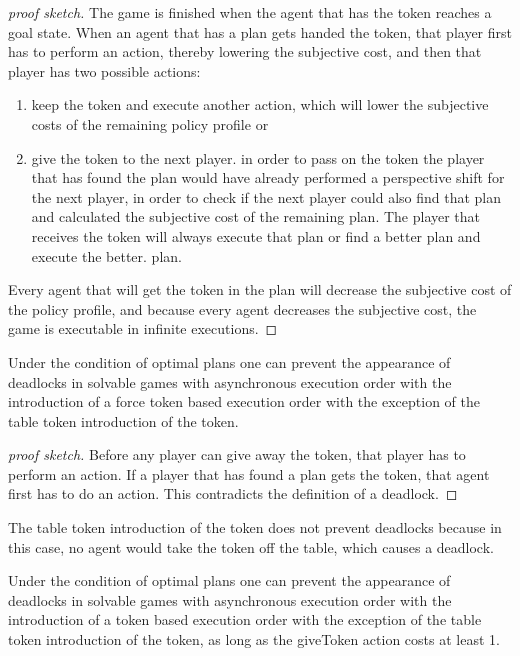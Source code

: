 \begin{proof}[proof sketch]
  The game is finished when the agent that has the token reaches a goal state. When an agent that has a plan gets handed the token, that player first has to perform an action, thereby lowering the subjective cost, and then that player has two possible actions:
  \begin{enumerate}
    \item keep the token and execute another action, which will lower the subjective costs of the remaining policy profile or
    \item give the token to the next player. in order to pass on the token the player that has found the plan would have already performed a perspective shift for the next player, in order to check if the next player could also find that plan and calculated the subjective cost of the remaining plan. The player that receives the token will always execute that plan or find a better plan and execute the better. plan.
  \end{enumerate}
  Every agent that will get the token in the plan will decrease the subjective cost of the policy profile, and because every agent decreases the subjective cost, the game is executable in infinite executions.
\end{proof}

\begin{theorem}
Under the condition of optimal plans one can prevent the appearance of deadlocks in solvable games with asynchronous execution order with the introduction of a force token based execution order with the exception of the table token introduction of the token.
\end{theorem}

\begin{proof}[proof sketch]
  Before any player can give away the token, that player has to perform an action. If a player that has found a plan gets the token, that agent first has to do an action. This contradicts the definition of a deadlock.
\end{proof}

The table token introduction of the token does not prevent deadlocks because in this case, no agent would take the token off the table, which causes a deadlock.

\begin{theorem}
  Under the condition of optimal plans one can prevent the appearance of deadlocks in solvable games with asynchronous execution order with the introduction of a token based execution order with the exception of the table token introduction of the token, as long as the giveToken action costs at least 1.
\end{theorem}

